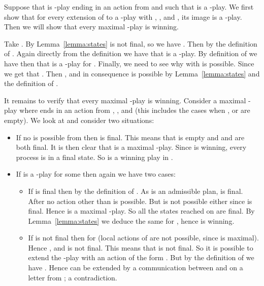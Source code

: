 \documentclass{llncs}
\renewenvironment{proof}{{\em Proof. }}{\nopagebreak
  \hspace*{\fill}}
\begin{document}
\begin{proof}
  Suppose that  is -play ending in an action from
   and such that  is a -play. We first show
  that for every extension of  to a -play  with , , and , its image
   is a -play. Then we will show that
  every maximal -play is winning.

  Take . By Lemma~\ref{lemma:states}  is not
  final, so we have . Then
   by the definition of . Again directly from the
  definition we have that  is a -play. By
  definition of  we have then that  is a
  -play for . Finally, we need to see why
   with  is possible. Since
   we get that . Then
  , and in consequence
   is possible by
  Lemma~\ref{lemma:states} and the definition of .

  It remains to verify that every maximal -play is winning. Consider a
  maximal -play  where  ends in an action from ,
  , and  (this includes the cases
  when , or  are empty). We look at  and consider two
  situations:

  \begin{itemize}
  \item If no  is possible from  then
     is final. This means that  is empty and
     and  are both final. It is then clear
    that  is a maximal -play. Since  is winning,
    every process is in a final state. So  is a winning play in
    .
  \item If  is a -play for some  then again we
    have two cases:
    \begin{itemize}
    \item If  is final then  by
      the definition of . As  is an admissible plan,  is
      final. After  no action other than  is
      possible. But  is not possible either since  is
      final. Hence  is a maximal -play. So all the
      states reached on  are final. By
      Lemma~\ref{lemma:states} we deduce the same for , hence
       is winning.
    \item If  is not final then  for
       (local actions of  are not possible, since 
      is maximal). Hence , and  is not final. This
      means that  is not final. So it is
      possible to extend the -play with an action of the form . But
      by the definition of  we have . Hence 
       can be extended by a communication between  and  on
      a letter from ; a contradiction.
    \end{itemize}
  \end{itemize}
\end{proof}

\medskip
\end{document}
